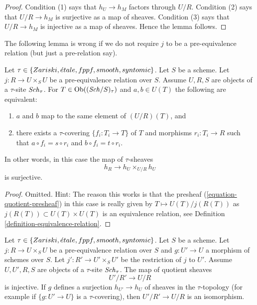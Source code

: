 \begin{proof}
Condition (1) says that $h_U \to h_M$ factors through $U/R$.
Condition (2) says that $U/R \to h_M$ is surjective as a map of sheaves.
Condition (3) says that $U/R \to h_M$ is injective as a map of sheaves.
Hence the lemma follows.
\end{proof}

\noindent
The following lemma is wrong if we do not require $j$ to be a
pre-equivalence relation (but just a pre-relation say).

\begin{lemma}
\label{lemma-quotient-pre-equivalence}
Let $\tau \in \{Zariski, {\acute{e}tale}, fppf, smooth, syntomic\}$.
Let $S$ be a scheme.
Let $j : R \to U \times_S U$ be a pre-equivalence relation over $S$.
Assume $U, R, S$ are objects of a $\tau$-site $\mathit{Sch}_\tau$.
For $T \in \mathop{\mathrm{Ob}}\nolimits((\mathit{Sch}/S)_\tau)$ and
$a, b \in U(T)$ the following are equivalent:
\begin{enumerate}
\item $a$ and $b$ map to the same element of $(U/R)(T)$, and
\item there exists a $\tau$-covering $\{f_i : T_i \to T\}$ of $T$
and morphisms $r_i : T_i \to R$ such that
$a \circ f_i = s \circ r_i$ and $b \circ f_i = t \circ r_i$.
\end{enumerate}
In other words, in this case the map of $\tau$-sheaves
$$
h_R \longrightarrow h_U \times_{U/R} h_U
$$
is surjective.
\end{lemma}

\begin{proof}
Omitted. Hint: The reason this works is that the presheaf
(\ref{equation-quotient-presheaf}) in this case is really given
by $T \mapsto U(T)/j(R(T))$ as $j(R(T)) \subset U(T) \times U(T)$
is an equivalence relation, see
Definition \ref{definition-equivalence-relation}.
\end{proof}

\begin{lemma}
\label{lemma-quotient-pre-equivalence-relation-restrict}
Let $\tau \in \{Zariski, {\acute{e}tale}, fppf, smooth, syntomic\}$.
Let $S$ be a scheme.
Let $j : R \to U \times_S U$ be a pre-equivalence relation over $S$
and $g : U' \to U$ a morphism of schemes over $S$.
Let $j' : R' \to U' \times_S U'$ be the restriction of $j$ to $U'$.
Assume  $U, U', R, S$ are objects of a $\tau$-site $\mathit{Sch}_\tau$.
The map of quotient sheaves
$$
U'/R' \longrightarrow U/R
$$
is injective. If $g$ defines a surjection $h_{U'} \to h_U$ of sheaves
in the $\tau$-topology (for example if $\{g : U' \to U\}$ is a
$\tau$-covering), then $U'/R' \to U/R$ is an isomorphism.
\end{lemma}

